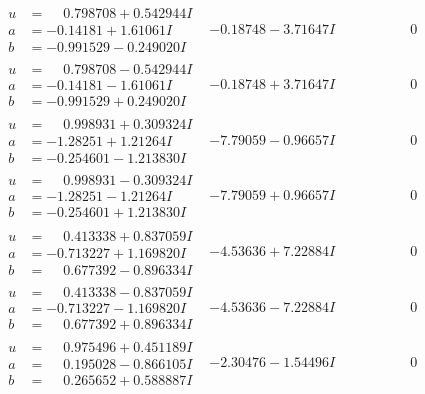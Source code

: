 \documentclass[1p]{elsarticle_modified}
\theoremstyle{definition}
\begin{document}
$$\begin{array}{c|c|c}
\begin{aligned}
u &= \phantom{-}0.798708 + 0.542944 I \\
a &= -0.14181 + 1.61061 I \\
b &= -0.991529 - 0.249020 I\end{aligned}
 & -0.18748 - 3.71647 I & \phantom{-0.000000 } 0 \\ \hline\begin{aligned}
u &= \phantom{-}0.798708 - 0.542944 I \\
a &= -0.14181 - 1.61061 I \\
b &= -0.991529 + 0.249020 I\end{aligned}
 & -0.18748 + 3.71647 I & \phantom{-0.000000 } 0 \\ \hline\begin{aligned}
u &= \phantom{-}0.998931 + 0.309324 I \\
a &= -1.28251 + 1.21264 I \\
b &= -0.254601 - 1.213830 I\end{aligned}
 & -7.79059 - 0.96657 I & \phantom{-0.000000 } 0 \\ \hline\begin{aligned}
u &= \phantom{-}0.998931 - 0.309324 I \\
a &= -1.28251 - 1.21264 I \\
b &= -0.254601 + 1.213830 I\end{aligned}
 & -7.79059 + 0.96657 I & \phantom{-0.000000 } 0 \\ \hline\begin{aligned}
u &= \phantom{-}0.413338 + 0.837059 I \\
a &= -0.713227 + 1.169820 I \\
b &= \phantom{-}0.677392 - 0.896334 I\end{aligned}
 & -4.53636 + 7.22884 I & \phantom{-0.000000 } 0 \\ \hline\begin{aligned}
u &= \phantom{-}0.413338 - 0.837059 I \\
a &= -0.713227 - 1.169820 I \\
b &= \phantom{-}0.677392 + 0.896334 I\end{aligned}
 & -4.53636 - 7.22884 I & \phantom{-0.000000 } 0 \\ \hline\begin{aligned}
u &= \phantom{-}0.975496 + 0.451189 I \\
a &= \phantom{-}0.195028 - 0.866105 I \\
b &= \phantom{-}0.265652 + 0.588887 I\end{aligned}
 & -2.30476 - 1.54496 I & \phantom{-0.000000 } 0 \\ \hline\begin{aligned}

\end{aligned}
\end{array}$$
\end{document}
